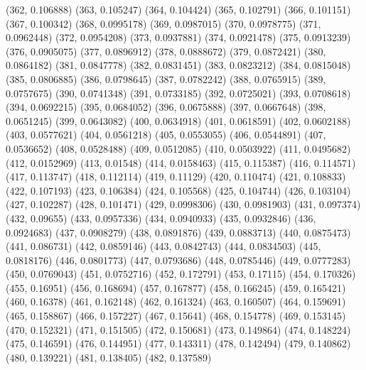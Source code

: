{					(362, 0.106888)
					(363, 0.105247)
					(364, 0.104424)
					(365, 0.102791)
					(366, 0.101151)
					(367, 0.100342)
					(368, 0.0995178)
					(369, 0.0987015)
					(370, 0.0978775)
					(371, 0.0962448)
					(372, 0.0954208)
					(373, 0.0937881)
					(374, 0.0921478)
					(375, 0.0913239)
					(376, 0.0905075)
					(377, 0.0896912)
					(378, 0.0888672)
					(379, 0.0872421)
					(380, 0.0864182)
					(381, 0.0847778)
					(382, 0.0831451)
					(383, 0.0823212)
					(384, 0.0815048)
					(385, 0.0806885)
					(386, 0.0798645)
					(387, 0.0782242)
					(388, 0.0765915)
					(389, 0.0757675)
					(390, 0.0741348)
					(391, 0.0733185)
					(392, 0.0725021)
					(393, 0.0708618)
					(394, 0.0692215)
					(395, 0.0684052)
					(396, 0.0675888)
					(397, 0.0667648)
					(398, 0.0651245)
					(399, 0.0643082)
					(400, 0.0634918)
					(401, 0.0618591)
					(402, 0.0602188)
					(403, 0.0577621)
					(404, 0.0561218)
					(405, 0.0553055)
					(406, 0.0544891)
					(407, 0.0536652)
					(408, 0.0528488)
					(409, 0.0512085)
					(410, 0.0503922)
					(411, 0.0495682)
					(412, 0.0152969)
					(413, 0.01548)
					(414, 0.0158463)
					(415, 0.115387)
					(416, 0.114571)
					(417, 0.113747)
					(418, 0.112114)
					(419, 0.11129)
					(420, 0.110474)
					(421, 0.108833)
					(422, 0.107193)
					(423, 0.106384)
					(424, 0.105568)
					(425, 0.104744)
					(426, 0.103104)
					(427, 0.102287)
					(428, 0.101471)
					(429, 0.0998306)
					(430, 0.0981903)
					(431, 0.097374)
					(432, 0.09655)
					(433, 0.0957336)
					(434, 0.0940933)
					(435, 0.0932846)
					(436, 0.0924683)
					(437, 0.0908279)
					(438, 0.0891876)
					(439, 0.0883713)
					(440, 0.0875473)
					(441, 0.086731)
					(442, 0.0859146)
					(443, 0.0842743)
					(444, 0.0834503)
					(445, 0.0818176)
					(446, 0.0801773)
					(447, 0.0793686)
					(448, 0.0785446)
					(449, 0.0777283)
					(450, 0.0769043)
					(451, 0.0752716)
					(452, 0.172791)
					(453, 0.17115)
					(454, 0.170326)
					(455, 0.16951)
					(456, 0.168694)
					(457, 0.167877)
					(458, 0.166245)
					(459, 0.165421)
					(460, 0.16378)
					(461, 0.162148)
					(462, 0.161324)
					(463, 0.160507)
					(464, 0.159691)
					(465, 0.158867)
					(466, 0.157227)
					(467, 0.15641)
					(468, 0.154778)
					(469, 0.153145)
					(470, 0.152321)
					(471, 0.151505)
					(472, 0.150681)
					(473, 0.149864)
					(474, 0.148224)
					(475, 0.146591)
					(476, 0.144951)
					(477, 0.143311)
					(478, 0.142494)
					(479, 0.140862)
					(480, 0.139221)
					(481, 0.138405)
					(482, 0.137589)
}

